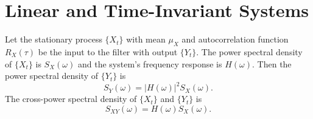 \section{Linear and Time-Invariant Systems}

\begin{theorem}
  Let the stationary process \(\{X_t\}\) with mean \(\mu_X\) and autocorrelation function \(R_X(\tau)\) be the input to the filter with output \(\{Y_t\}\). The power spectral density of \(\{X_t\}\) is \(S_X(\omega)\) and the system's frequency response is \(H(\omega)\). Then the power spectral density of \(\{Y_t\}\) is
  \[
    S_Y(\omega) = |H(\omega)|^2 S_X(\omega).
  \]
  The cross-power spectral density of \(\{X_t\}\) and \(\{Y_t\}\) is
  \[
    S_{XY}(\omega) = H(\omega) S_X(\omega).
  \]
\end{theorem}
